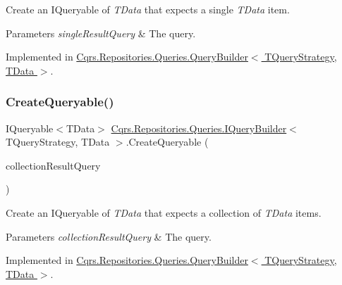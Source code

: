 Create an I\+Queryable of {\itshape T\+Data}  that expects a single {\itshape T\+Data}  item. 


\begin{DoxyParams}{Parameters}
{\em single\+Result\+Query} & The query.\\
\hline
\end{DoxyParams}


Implemented in \hyperlink{classCqrs_1_1Repositories_1_1Queries_1_1QueryBuilder_a6b103726f538e81ca0489a51b1aa3c88_a6b103726f538e81ca0489a51b1aa3c88}{Cqrs.\+Repositories.\+Queries.\+Query\+Builder$<$ T\+Query\+Strategy, T\+Data $>$}.

\mbox{\label{interfaceCqrs_1_1Repositories_1_1Queries_1_1IQueryBuilder_ab903955b6fb1843a3e168b33252161a5_ab903955b6fb1843a3e168b33252161a5}} 
\subsubsection{\texorpdfstring{Create\+Queryable()}{CreateQueryable()}\hspace{0.1cm}{\footnotesize\ttfamily [2/2]}}
{\footnotesize\ttfamily I\+Queryable$<$T\+Data$>$ \hyperlink{interfaceCqrs_1_1Repositories_1_1Queries_1_1IQueryBuilder}{Cqrs.\+Repositories.\+Queries.\+I\+Query\+Builder}$<$ T\+Query\+Strategy, T\+Data $>$.Create\+Queryable (\begin{DoxyParamCaption}\item[{\hyperlink{interfaceCqrs_1_1Repositories_1_1Queries_1_1ICollectionResultQuery}{I\+Collection\+Result\+Query}$<$ T\+Query\+Strategy, T\+Data $>$}]{collection\+Result\+Query }\end{DoxyParamCaption})}



Create an I\+Queryable of {\itshape T\+Data}  that expects a collection of {\itshape T\+Data}  items. 


\begin{DoxyParams}{Parameters}
{\em collection\+Result\+Query} & The query.\\
\hline
\end{DoxyParams}


Implemented in \hyperlink{classCqrs_1_1Repositories_1_1Queries_1_1QueryBuilder_af8860edf3677cb80ae481f17ff2db9b5_af8860edf3677cb80ae481f17ff2db9b5}{Cqrs.\+Repositories.\+Queries.\+Query\+Builder$<$ T\+Query\+Strategy, T\+Data $>$}.

